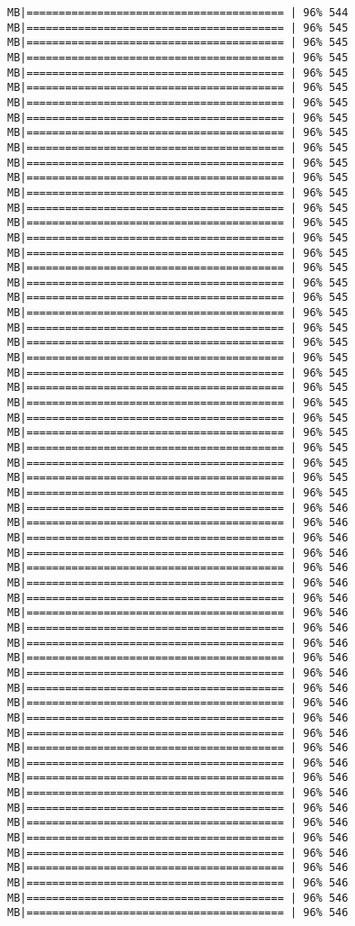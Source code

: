 \documentclass[
]{article}
\begin{document}
\begin{verbatim}
MB|======================================== | 96% 544 MB|======================================== | 96% 545 MB|======================================== | 96% 545 MB|======================================== | 96% 545 MB|======================================== | 96% 545 MB|======================================== | 96% 545 MB|======================================== | 96% 545 MB|======================================== | 96% 545 MB|======================================== | 96% 545 MB|======================================== | 96% 545 MB|======================================== | 96% 545 MB|======================================== | 96% 545 MB|======================================== | 96% 545 MB|======================================== | 96% 545 MB|======================================== | 96% 545 MB|======================================== | 96% 545 MB|======================================== | 96% 545 MB|======================================== | 96% 545 MB|======================================== | 96% 545 MB|======================================== | 96% 545 MB|======================================== | 96% 545 MB|======================================== | 96% 545 MB|======================================== | 96% 545 MB|======================================== | 96% 545 MB|======================================== | 96% 545 MB|======================================== | 96% 545 MB|======================================== | 96% 545 MB|======================================== | 96% 545 MB|======================================== | 96% 545 MB|======================================== | 96% 545 MB|======================================== | 96% 545 MB|======================================== | 96% 545 MB|======================================== | 96% 545 MB|======================================== | 96% 546 MB|======================================== | 96% 546 MB|======================================== | 96% 546 MB|======================================== | 96% 546 MB|======================================== | 96% 546 MB|======================================== | 96% 546 MB|======================================== | 96% 546 MB|======================================== | 96% 546 MB|======================================== | 96% 546 MB|======================================== | 96% 546 MB|======================================== | 96% 546 MB|======================================== | 96% 546 MB|======================================== | 96% 546 MB|======================================== | 96% 546 MB|======================================== | 96% 546 MB|======================================== | 96% 546 MB|======================================== | 96% 546 MB|======================================== | 96% 546 MB|======================================== | 96% 546 MB|======================================== | 96% 546 MB|======================================== | 96% 546 MB|======================================== | 96% 546 MB|======================================== | 96% 546 MB|======================================== | 96% 546 MB|======================================== | 96% 546 MB|======================================== | 96% 546 MB|======================================== | 96% 546 MB|======================================== | 96% 546 
\end{verbatim}
\end{document}
